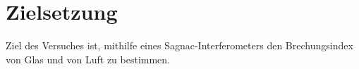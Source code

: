 
\section{Zielsetzung}
\label{sec:Zielsetzung}
Ziel des Versuches ist, mithilfe eines Sagnac-Interferometers den Brechungsindex von Glas und von Luft zu bestimmen.